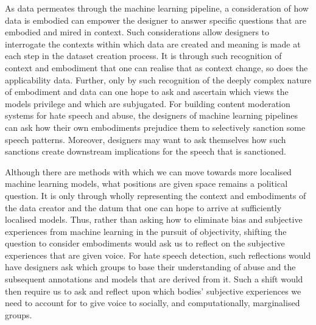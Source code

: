 {As data permeates through the machine learning pipeline, a consideration of how data is embodied can empower the designer to answer specific questions that are embodied and mired in context.
Such considerations allow designers to interrogate the contexts within which data are created and meaning is made at each step in the dataset creation process.
It is through such recognition of context and embodiment that one can realise that as context change, so does the applicability data.
Further, only by such recognition of the deeply complex nature of embodiment and data can one hope to ask and ascertain which views the models privilege and which are subjugated.
For building content moderation systems for hate speech and abuse, the designers of machine learning pipelines can ask how their own embodiments prejudice them to selectively sanction some speech patterns.
Moreover, designers may want to ask themselves how such sanctions create downstream implications for the speech that is sanctioned.

Although there are methods with which we can move towards more localised machine learning models, what positions are given space remains a political question.
It is only through wholly representing the context and embodiments of the data creator and the datum that one can hope to arrive at sufficiently localised models.
Thus, rather than asking how to eliminate bias and subjective experiences from machine learning in the pursuit of objectivity, shifting the question to consider embodiments would ask us to reflect on the subjective experiences that are given voice.
For hate speech detection, such reflections would have designers ask which groups to base their understanding of abuse and the subsequent annotations and models that are derived from it.
Such a shift would then require us to ask and reflect upon which bodies' subjective experiences we need to account for to give voice to socially, and computationally, marginalised groups.

}
